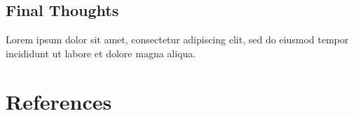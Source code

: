 \documentclass[12pt, a4paper]{article}
\begin{document}

\subsection{Final Thoughts}

Lorem ipsum dolor sit amet, consectetur adipiscing elit, sed do eiusmod tempor incididunt ut labore et dolore magna aliqua.

\pagebreak



\section{References}

\renewcommand{\refname}{\vskip -1cm}

\end{document}
